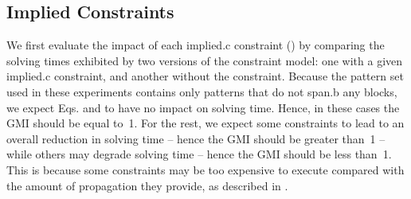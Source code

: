 \newsavebox{\solvTechPlot}
\newlength{\solvTechPlotW}
\newlength{\solvTechSubfigW}



\subsection{Implied Constraints}

We first evaluate the impact of each \gls{implied.c} \gls{constraint}
() by comparing the solving times exhibited by two versions of the
\gls{constraint model}: one with a given \gls{implied.c} \gls{constraint}, and
another without the \gls{constraint}.
%
Because the \gls{pattern set} used in these experiments contains only
\glspl{pattern} that do not \gls{span.b} any \glspl{block}, we expect
Eqs.\thinspace{} and
 to have no impact on solving time.
%
Hence, in these cases the \gls{GMI} should be equal to~\num{1}.
%
For the rest, we expect some \glspl{constraint} to lead to an overall reduction
in solving time -- hence the \gls{GMI} should be greater than~\num{1} -- while
others may degrade solving time -- hence the \gls{GMI} should be less
than~\num{1}.
%
This is because some \glspl{constraint} may be too expensive to execute compared
with the amount of \gls{propagation} they provide, as described in
.

